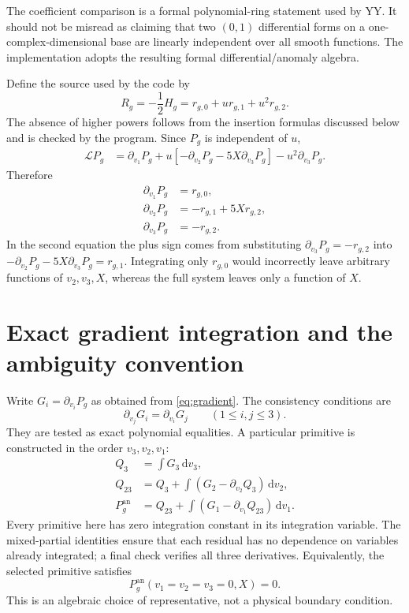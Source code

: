 \documentclass[11pt,a4paper]{article}
\numberwithin{equation}{section}
\newcommand{\dd}{\mathrm d}
\newcommand{\del}{\partial}
\newcommand{\an}{\mathrm{an}}
\begin{document}
The coefficient comparison is a formal polynomial-ring statement used by YY.
It should not be misread as claiming that two $(0,1)$ differential forms on a
one-complex-dimensional base are linearly independent over all smooth functions.
The implementation adopts the resulting formal differential/anomaly algebra.

Define the source used by the code by
\begin{equation}
R_g=-\frac12 H_g=r_{g,0}+ur_{g,1}+u^2r_{g,2}.
\end{equation}
The absence of higher powers follows from the insertion formulas discussed
below and is checked by the program. Since $P_g$ is independent of $u$,
\begin{align}
\mathscr L P_g
 &=\del_{v_1}P_g
    +u[-\del_{v_2}P_g-5X\del_{v_3}P_g]
    -u^2\del_{v_3}P_g.
\end{align}
Therefore
\begin{equation}\boxed{\begin{aligned}
\del_{v_1}P_g&=r_{g,0},\\
\del_{v_2}P_g&=-r_{g,1}+5Xr_{g,2},\\
\del_{v_3}P_g&=-r_{g,2}.
\end{aligned}}\label{eq:gradient}
\end{equation}
In the second equation the plus sign comes from substituting
$\del_{v_3}P_g=-r_{g,2}$ into
$-\del_{v_2}P_g-5X\del_{v_3}P_g=r_{g,1}$.
Integrating only $r_{g,0}$ would incorrectly leave arbitrary functions of
$v_2,v_3,X$, whereas the full system leaves only a function of $X$.

\section{Exact gradient integration and the ambiguity convention}

Write $G_i=\del_{v_i}P_g$ as obtained from \eqref{eq:gradient}.
The consistency conditions are
\begin{equation}
\del_{v_j}G_i=\del_{v_i}G_j\qquad(1\le i,j\le3).
\end{equation}
They are tested as exact polynomial equalities. A particular primitive is
constructed in the order $v_3,v_2,v_1$:
\begin{align}
Q_3&=\int G_3\,\dd v_3,\\
Q_{23}&=Q_3+\int(G_2-\del_{v_2}Q_3)\,\dd v_2,\\
P_g^{\an}&=Q_{23}+\int(G_1-\del_{v_1}Q_{23})\,\dd v_1.
\end{align}
Every primitive here has zero integration constant in its integration variable.
The mixed-partial identities ensure that each residual has no dependence on
variables already integrated; a final check verifies all three derivatives.
Equivalently, the selected primitive satisfies
\begin{equation}
P_g^{\an}(v_1=v_2=v_3=0,X)=0.
\end{equation}
This is an algebraic choice of representative, not a physical boundary condition.
\end{document}
